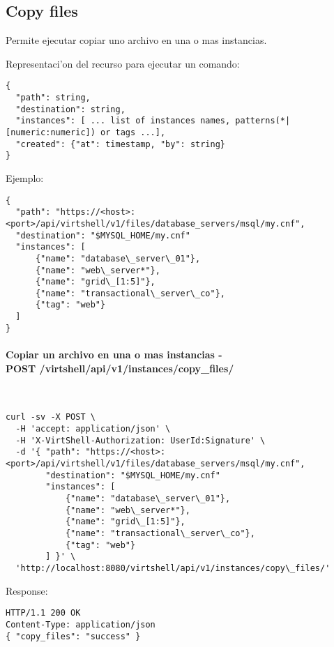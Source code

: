 \subsection{Copy files}

Permite ejecutar copiar uno archivo en una o mas instancias.

Representaci'on del recurso para ejecutar un comando:

\medskip
\begin{lstlisting}[style=json]
{
  "path": string,
  "destination": string,
  "instances": [ ... list of instances names, patterns(*|[numeric:numeric]) or tags ...],
  "created": {"at": timestamp, "by": string}
}
\end{lstlisting}

Ejemplo:

\medskip
\begin{lstlisting}[style=json]
{
  "path": "https://<host>:<port>/api/virtshell/v1/files/database_servers/msql/my.cnf",
  "destination": "$MYSQL_HOME/my.cnf"
  "instances": [
      {"name": "database\_server\_01"},
      {"name": "web\_server*"},
      {"name": "grid\_[1:5]"},
      {"name": "transactional\_server\_co"},
      {"tag": "web"}
  ]
}
\end{lstlisting}

\paragraph{Copiar un archivo en una o mas instancias - \\ POST /virtshell/api/v1/instances/copy\_files/} ~\\

\begin{lstlisting}[style=json]
curl -sv -X POST \
  -H 'accept: application/json' \
  -H 'X-VirtShell-Authorization: UserId:Signature' \
  -d '{ "path": "https://<host>:<port>/api/virtshell/v1/files/database_servers/msql/my.cnf",
        "destination": "$MYSQL_HOME/my.cnf"
        "instances": [
            {"name": "database\_server\_01"},
            {"name": "web\_server*"},
            {"name": "grid\_[1:5]"},
            {"name": "transactional\_server\_co"},
            {"tag": "web"}
        ] }' \
  'http://localhost:8080/virtshell/api/v1/instances/copy\_files/'
\end{lstlisting}

Response:

\begin{lstlisting}[style=json]
HTTP/1.1 200 OK
Content-Type: application/json
{ "copy_files": "success" }
\end{lstlisting}
